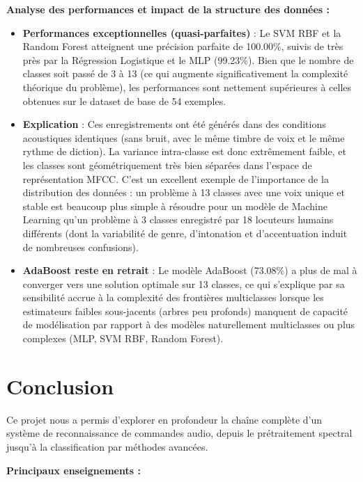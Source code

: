 \documentclass{name}
\begin{document}
\textbf{Analyse des performances et impact de la structure des données :}
\begin{itemize}
    \item \textbf{Performances exceptionnelles (quasi-parfaites)} : Le SVM RBF et la Random Forest atteignent une précision parfaite de 100.00\%, suivis de très près par la Régression Logistique et le MLP (99.23\%). Bien que le nombre de classes soit passé de 3 à 13 (ce qui augmente significativement la complexité théorique du problème), les performances sont nettement supérieures à celles obtenues sur le dataset de base de 54 exemples.
    \item \textbf{Explication} : Ces enregistrements ont été générés dans des conditions acoustiques identiques (sans bruit, avec le même timbre de voix et le même rythme de diction). La variance intra-classe est donc extrêmement faible, et les classes sont géométriquement très bien séparées dans l'espace de représentation MFCC. C'est un excellent exemple de l'importance de la distribution des données : un problème à 13 classes avec une voix unique et stable est beaucoup plus simple à résoudre pour un modèle de Machine Learning qu'un problème à 3 classes enregistré par 18 locuteurs humains différents (dont la variabilité de genre, d'intonation et d'accentuation induit de nombreuses confusions).
    \item \textbf{AdaBoost reste en retrait} : Le modèle AdaBoost (73.08\%) a plus de mal à converger vers une solution optimale sur 13 classes, ce qui s'explique par sa sensibilité accrue à la complexité des frontières multiclasses lorsque les estimateurs faibles sous-jacents (arbres peu profonds) manquent de capacité de modélisation par rapport à des modèles naturellement multiclasses ou plus complexes (MLP, SVM RBF, Random Forest).
\end{itemize}

\newpage
\section{Conclusion}

Ce projet nous a permis d'explorer en profondeur la chaîne complète d'un système de reconnaissance de commandes audio, depuis le prétraitement spectral jusqu'à la classification par méthodes avancées.

\textbf{Principaux enseignements :}
\end{document}
